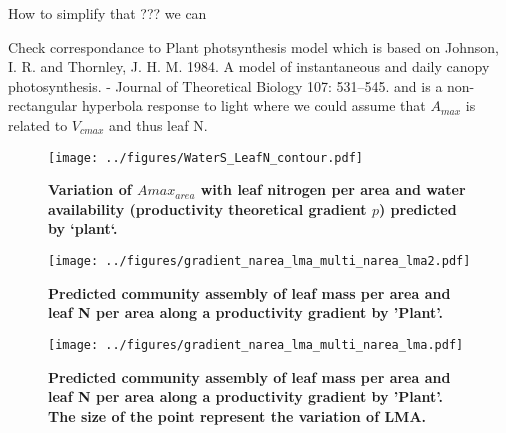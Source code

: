 \documentclass[a4paper,11pt]{article}
\begin{document}
How to simplify that ??? we can


Check correspondance to Plant photsynthesis model which is based on Johnson, I. R. and Thornley, J. H. M. 1984. A model of instantaneous and daily canopy photosynthesis. - Journal of Theoretical Biology 107: 531–545.
 and is a non-rectangular hyperbola response to light where we could assume that $A_{max}$ is related to $V_{cmax}$ and thus leaf N.





\begin{figure}[ht]
\centering
\texttt{[image: ../figures/WaterS\_LeafN\_contour.pdf]}
\caption{\textbf{Variation of $A{max}_{area}$ with leaf nitrogen per area and water availability (productivity theoretical gradient $p$) predicted by `plant`.}
\label{fig:leafN_water}}
\end{figure}


\begin{figure}[ht]
\centering
\texttt{[image: ../figures/gradient\_narea\_lma\_multi\_narea\_lma2.pdf]}
\caption{\textbf{Predicted community assembly of leaf mass per area and leaf N per area along a productivity gradient by 'Plant'.}
\label{fig:lma_mat_o_map}}
\end{figure}

\begin{figure}[ht]
\centering
\texttt{[image: ../figures/gradient\_narea\_lma\_multi\_narea\_lma.pdf]}
\caption{\textbf{Predicted community assembly of leaf mass per area and leaf N per area along a productivity gradient by 'Plant'. The size of the point represent the variation of LMA.}
\label{fig:lma_mat_o_map}}
\end{figure}

\clearpage




\end{document}

